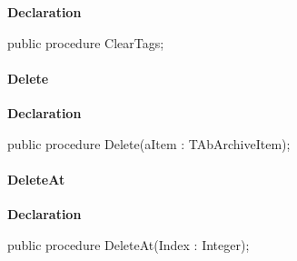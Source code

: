 \documentclass{report}
\newif\ifpdf
\begin{document}
\label{AbArcTyp.TAbArchive-ClearTags}
\begin{list}{}{
\setlength{\itemindent}{0cm}
\setlength{\listparindent}{0cm}
\setlength{\leftmargin}{\evensidemargin}
\addtolength{\leftmargin}{\tmplength}
\settowidth{\labelsep}{X}
\addtolength{\leftmargin}{\labelsep}
\setlength{\labelwidth}{\tmplength}
}
\item[\textbf{Declaration}\hfill]
\ifpdf
\begin{flushleft}
\fi
\begin{ttfamily}
public procedure ClearTags;\end{ttfamily}

\ifpdf
\end{flushleft}
\fi

\end{list}
\paragraph*{Delete}\hspace*{\fill}

\label{AbArcTyp.TAbArchive-Delete}
\begin{list}{}{
\setlength{\itemindent}{0cm}
\setlength{\listparindent}{0cm}
\setlength{\leftmargin}{\evensidemargin}
\addtolength{\leftmargin}{\tmplength}
\settowidth{\labelsep}{X}
\addtolength{\leftmargin}{\labelsep}
\setlength{\labelwidth}{\tmplength}
}
\item[\textbf{Declaration}\hfill]
\ifpdf
\begin{flushleft}
\fi
\begin{ttfamily}
public procedure Delete(aItem : TAbArchiveItem);\end{ttfamily}

\ifpdf
\end{flushleft}
\fi

\end{list}
\paragraph*{DeleteAt}\hspace*{\fill}

\label{AbArcTyp.TAbArchive-DeleteAt}
\begin{list}{}{
\setlength{\itemindent}{0cm}
\setlength{\listparindent}{0cm}
\setlength{\leftmargin}{\evensidemargin}
\addtolength{\leftmargin}{\tmplength}
\settowidth{\labelsep}{X}
\addtolength{\leftmargin}{\labelsep}
\setlength{\labelwidth}{\tmplength}
}
\item[\textbf{Declaration}\hfill]
\ifpdf
\begin{flushleft}
\fi
\begin{ttfamily}
public procedure DeleteAt(Index : Integer);\end{ttfamily}

\ifpdf
\end{flushleft}
\fi

\end{list}
\end{document}
